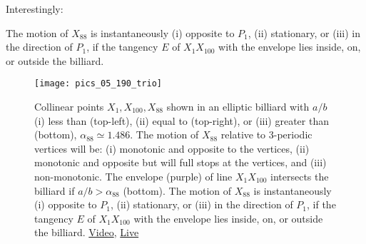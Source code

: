 Interestingly:

\begin{proposition}
The motion of $X_{88}$ is instantaneously (i) opposite to $P_1$, (ii) stationary, or (iii) in the direction of $P_1$, if the tangency $E$ of $X_1 X_{100}$ with the envelope lies inside, on, or outside the billiard.
\label{prop:05-x88-envelope}
\end{proposition}

\begin{figure}
    \centering
    \texttt{[image: pics\_05\_190\_trio]}
     \caption{Collinear points $X_1,X_{100},X_{88}$ shown in an elliptic billiard with $a/b$ (i) less than (top-left), (ii) equal to (top-right), or (iii) greater than (bottom), $\alpha_{88}{\simeq}1.486$. The motion of $X_{88}$ relative to 3-periodic vertices will be: (i) monotonic and opposite to the vertices, (ii) monotonic and opposite but will full stops at the vertices, and (iii) non-monotonic. The envelope (purple) of line  $X_1 X_{100}$ intersects the billiard if $a/b>\alpha_{88}$ (bottom). The motion of $X_{88}$ is instantaneously (i) opposite to $P_1$, (ii) stationary, or (iii) in the direction of $P_1$, if the tangency $E$ of $X_1 X_{100}$ with the envelope lies inside, on, or outside the billiard. \href{https://youtu.be/nJLp--JjDZU}{Video}, \href{https://bit.ly/3hKicgM}{Live}}
    \label{fig:05-x88-envelope}
\end{figure}